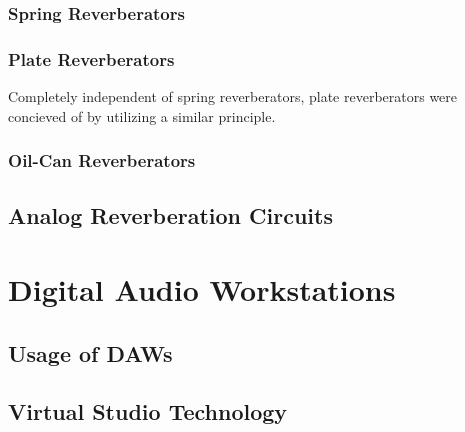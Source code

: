 \subsubsection{Spring Reverberators}
\subsubsection{Plate Reverberators}
Completely independent of spring reverberators, plate reverberators were concieved of by utilizing a similar principle.

\subsubsection{Oil-Can Reverberators}
\subsection{Analog Reverberation Circuits}
\section{Digital Audio Workstations}
\subsection{Usage of DAWs}
\subsection{Virtual Studio Technology}
